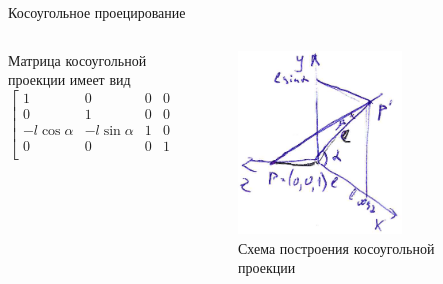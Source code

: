 \documentclass{beamer}
\begin{document}
	\begin{frame}{Косоугольное проецирование}
		\begin{columns}
			\begin{column}{0.5\textwidth}
				Матрица косоугольной проекции имеет вид
				\[
					\begin{bmatrix}
						1 & 0 & 0 & 0 \\
						0 & 1 & 0 & 0 \\
						-l \cos \alpha & - l \sin \alpha & 1 & 0 \\
						0 & 0 & 0 & 1 \\
					\end{bmatrix}	
				\]
			\end{column}
			\begin{column}{0.5\textwidth}
				\begin{figure} 
						\includegraphics[width=0.7\textwidth]{images/oblique_sceme.png}
					\caption{Схема построения косоугольной проекции}
				\end{figure}
			\end{column}
		\end{columns}
	\end{frame}
\end{document}
